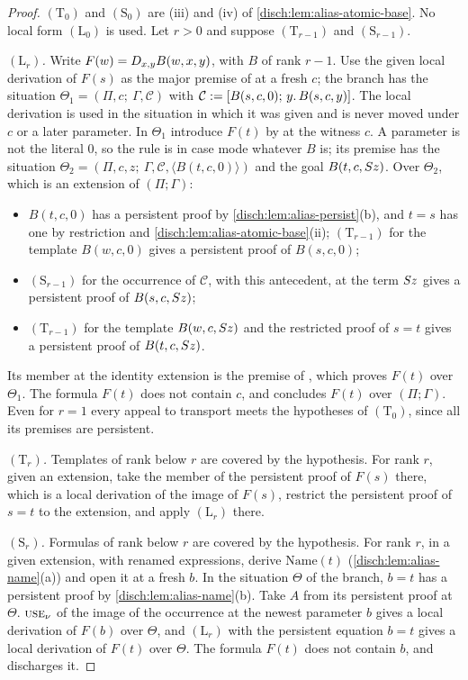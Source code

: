 \begin{proof}
$(\mathrm T_0)$ and $(\mathrm S_0)$ are (iii) and (iv) of
\cref{disch:lem:alias-atomic-base}. No local form $(\mathrm L_0)$ is used.
Let $r>0$ and suppose $(\mathrm T_{r-1})$ and $(\mathrm S_{r-1})$.

\emph{$(\mathrm L_r)$.} Write $F(w)=D_{x,y}B(w,x,y)$, with $B$ of rank
$r-1$. Use the given local derivation of $F(s)$ as the major premise of
 at a fresh $c$; the branch has the situation
$\Theta_1=(\Pi,c;\ \Gamma,\mathcal C)$ with
$\mathcal C\mathrel{:=}[B(s,c,0);\,y.\,B(s,c,y)]$. The local derivation is used
in the situation in which it was given and is never moved under $c$ or a
later parameter. In $\Theta_1$ introduce $F(t)$ by  at the
witness $c$. A parameter is not the literal $0$, so the rule is in case
mode whatever $B$ is; its premise has the situation
$\Theta_2=(\Pi,c,z;\ \Gamma,\mathcal C,\langle B(t,c,0)\rangle)$ and the
goal $B(t,c,S z)$. Over $\Theta_2$, which is an extension of
$(\Pi;\Gamma)$:
\begin{itemize}
\item $B(t,c,0)$ has a persistent proof by
 \cref{disch:lem:alias-persist}(b), and $t=s$ has one by restriction and
 \cref{disch:lem:alias-atomic-base}(ii); $(\mathrm T_{r-1})$ for the
 template $B(w,c,0)$ gives a persistent proof of $B(s,c,0)$;
\item $(\mathrm S_{r-1})$ for the occurrence of $\mathcal C$, with this
 antecedent, at the term $S z$ gives a persistent proof of
 $B(s,c,S z)$;
\item $(\mathrm T_{r-1})$ for the template $B(w,c,S z)$ and the
 restricted proof of $s=t$ gives a persistent proof of $B(t,c,S z)$.
\end{itemize}
Its member at the identity extension is the premise of ,
which proves $F(t)$ over $\Theta_1$. The formula $F(t)$ does not contain
$c$, and  concludes $F(t)$ over $(\Pi;\Gamma)$. Even for
$r=1$ every appeal to transport meets the hypotheses of $(\mathrm T_0)$,
since all its premises are persistent.

\emph{$(\mathrm T_r)$.} Templates of rank below $r$ are covered by the
hypothesis. For rank $r$, given an extension, take the member of the
persistent proof of $F(s)$ there, which is a local derivation of the image
of $F(s)$, restrict the persistent proof of $s=t$ to the extension, and
apply $(\mathrm L_r)$ there.

\emph{$(\mathrm S_r)$.} Formulas of rank below $r$ are covered by the
hypothesis. For rank $r$, in a given extension, with renamed expressions,
derive $\mathrm{Name}(t)$ (\cref{disch:lem:alias-name}(a)) and open it at
a fresh $b$. In the situation $\Theta$ of the branch, $b=t$ has a
persistent proof by \cref{disch:lem:alias-name}(b). Take $A$ from its
persistent proof at $\Theta$. $\rulename{Use}_{\nu}$ of the image of the
occurrence at the newest parameter $b$ gives a local derivation of $F(b)$
over $\Theta$, and $(\mathrm L_r)$ with the persistent equation $b=t$ gives
a local derivation of $F(t)$ over $\Theta$. The formula $F(t)$ does not
contain $b$, and  discharges it.


\end{proof}
